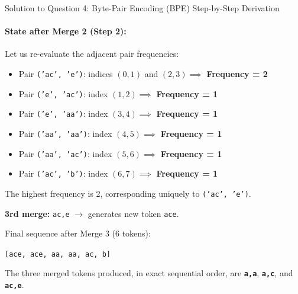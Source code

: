 \documentclass[11pt,a4paper]{article}
\begin{document}
\begin{solutionbox}{Solution to Question 4: Byte-Pair Encoding (BPE) Step-by-Step Derivation}
\paragraph{State after Merge 2 (Step 2):}
Let us re-evaluate the adjacent pair frequencies:
\begin{itemize}[leftmargin=2em]
    \item Pair \texttt{('ac', 'e')}: indices $(0,1)$ and $(2,3) \implies$ \textbf{Frequency = 2}
    \item Pair \texttt{('e', 'ac')}: index $(1,2) \implies$ \textbf{Frequency = 1}
    \item Pair \texttt{('e', 'aa')}: index $(3,4) \implies$ \textbf{Frequency = 1}
    \item Pair \texttt{('aa', 'aa')}: index $(4,5) \implies$ \textbf{Frequency = 1}
    \item Pair \texttt{('aa', 'ac')}: index $(5,6) \implies$ \textbf{Frequency = 1}
    \item Pair \texttt{('ac', 'b')}: index $(6,7) \implies$ \textbf{Frequency = 1}
\end{itemize}
The highest frequency is 2, corresponding uniquely to \texttt{('ac', 'e')}.
\begin{takeawaybox}
\textbf{3rd merge:} \texttt{ac,e} $\longrightarrow$ generates new token \texttt{ace}.
\end{takeawaybox}
Final sequence after Merge 3 (6 tokens):
\begin{center}
\texttt{[ace, ace, aa, aa, ac, b]}
\end{center}
The three merged tokens produced, in exact sequential order, are \textbf{\texttt{a,a}}, \textbf{\texttt{a,c}}, and \textbf{\texttt{ac,e}}.
\end{solutionbox}
\end{document}
